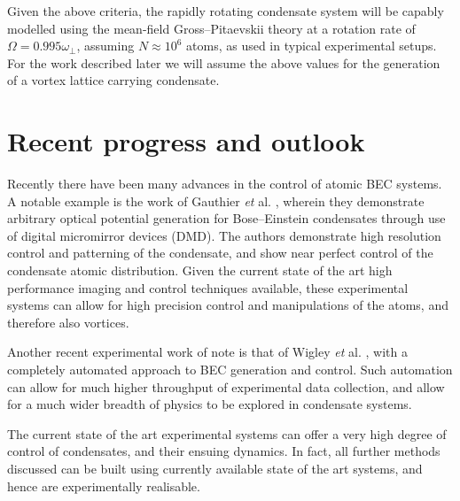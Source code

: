 Given the above criteria, the rapidly rotating condensate system will be capably modelled using the mean-field Gross--Pitaevskii theory at a rotation rate of $\Omega = 0.995\omega_{\perp}$, assuming $N\approx 10^6$ atoms, as used in typical experimental setups. For the work described later we will assume the above values for the generation of a vortex lattice carrying condensate.

\section{Recent progress and outlook}
Recently there have been many advances in the control of atomic BEC systems. A notable example is the work of Gauthier \textit{et} al. \cite{BEC:Gauthier_arxiv_2016}, wherein they demonstrate arbitrary optical potential generation for Bose--Einstein condensates through use of digital micromirror devices (DMD). The authors demonstrate high resolution control and patterning of the condensate, and show near perfect control of the condensate atomic distribution. Given the current state of the art high performance imaging and control techniques available, these experimental systems can allow for high precision control and manipulations of the atoms, and therefore also vortices.

Another recent experimental work of note is that of Wigley \textit{et} al. \cite{BEC:Wigley_scirep_2016}, with a completely automated approach to BEC generation and control. Such automation can allow for much higher throughput of experimental data collection, and allow for a much wider breadth of physics to be explored in condensate systems.

The current state of the art experimental systems can offer a very high degree of control of condensates, and their ensuing dynamics. In fact, all further methods discussed can be built using currently available state of the art systems, and hence are experimentally realisable.
